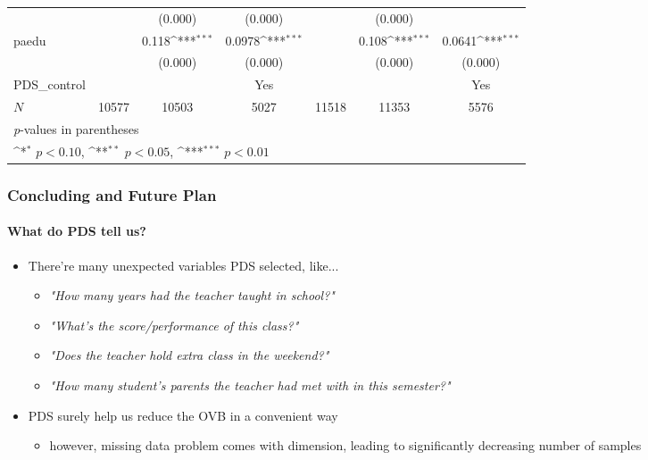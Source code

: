 \documentclass{beamer}
\def\sym#1{\ifmmode^{#1}\else\(^{#1}\)\fi}
\begin{document}
\begin{frame}[shrink=38]
\begin{tabular}{l*{6}c}
                &                     &     (0.000)         &     (0.000)         &                     &     (0.000)         &                     \\
    [1em]
    paedu       &                     &       0.118\sym{***}&      0.0978\sym{***}&                     &       0.108\sym{***}&      0.0641\sym{***}\\
                &                     &     (0.000)         &     (0.000)         &                     &     (0.000)         &     (0.000)         \\
    [1em]
    PDS\_control  &                     &                    &      Yes             &                   &                 &      Yes \\
    \hline
    \(N\)       &       10577         &       10503         &        5027         &       11518         &       11353         &        5576         \\
    \bottomrule
    \multicolumn{7}{l}{\footnotesize \textit{p}-values in parentheses} \\
    \multicolumn{7}{l}{\footnotesize \sym{*} \(p<0.10\), \sym{**} \(p<0.05\), \sym{***} \(p<0.01\)} \\
\end{tabular}

\end{frame}


\begin{frame} %
\frametitle{Concluding and Future Plan}
\framesubtitle{What do PDS tell us?}

    \begin{itemize}
        \item There're many unexpected variables PDS selected, like...
        \begin{itemize}
        \item \textsl{"How many years had the teacher taught in school?"}
        \item \textit{"What's the score/performance of this class?"}
        \item \textit{"Does the teacher hold extra class in the weekend?"}
        \item \textit{"How many student's parents the teacher had met with in this semester?"}
        \end{itemize}
        \item PDS surely help us reduce the OVB in a convenient way
        \begin{itemize}
            \item however, missing data problem comes with dimension, leading to significantly decreasing number of samples
        \end{itemize}
    \end{itemize}

\end{frame}
    
\end{document}
